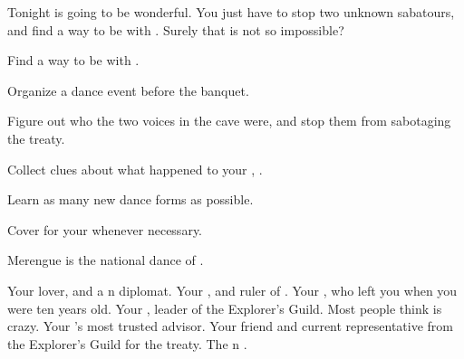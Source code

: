 \documentclass[char]{NeptuneBall}
\begin{document}
Tonight is going to be wonderful. You just have to stop two unknown sabatours, and find a way to be with \cDiplomat{}. Surely that is not so impossible?

\begin{itemz}[Goals]
  \item Find a way to be with \cDiplomat{}.
  \item Organize a dance event before the banquet.
  \item Figure out who the two voices in the cave were, and stop them from sabotaging the treaty.
  \item Collect clues about what happened to your \cQueen{\parent}, \cQueen{\King} \cQueen{}.
  \item Learn as many new dance forms as possible.
  \item Cover for your \cKing{\parent} whenever necessary.
\end{itemz}

\begin{itemz}[Trivia]
  \item Merengue is the national dance of \pAtlantis{}.
\end{itemz}

\begin{contacts}
  \contact{\cDiplomat{}} Your lover, and a \pPacifica{}n diplomat.
  \contact{\cKing{}} Your \cKing{\parent}, and ruler of \pAtlantis{}.
  \contact{\cAriel{}} Your \cAriel{\sibling}, who left you when you were ten years old.
  \contact{\cPlant{}} Your \cPlant{\uncle}, leader of the Explorer's Guild. Most people think  is crazy.
  \contact{\cManta{}} Your \cKing{\parent}'s most trusted advisor.
  \contact{\cPriest{}} Your friend and current representative from the Explorer's Guild for the treaty.
  \contact{\cPrince{}} The \pPacifica{}n \cPrince{\prince}.
\end{contacts}
\end{document}
